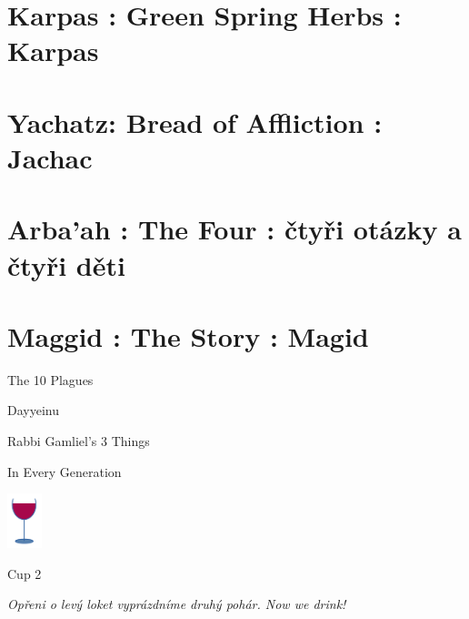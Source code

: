 \documentclass[a5paper,10pt]{memoir}
\begin{document}
\section{Karpas : Green Spring Herbs : Karpas}
 \Karpas
\vspace*{1ex}
\section{Yachatz: Bread of Affliction : Jachac}
\Yachatz
\vspace*{2ex}
\section{Arba'ah : The Four : čtyři otázky a čtyři děti}
\MaNishtana
\FourChildrenText
%
\vspace*{2ex}
\section{Maggid : The Story : Magid}
\MaggidIntro
\onecolumn
\begin{center}
	\noindent \large \color{midblue} The 10 Plagues \centering
\end{center}
\Plagues
\onecolumn
\begin{center}
	\noindent \large \color{midblue} Dayyeinu
\end{center}
\Dayyeinu
\begin{center}
	\noindent \large \color{midblue} Rabbi Gamliel's 3 Things
\end{center}
\Gamliel
\vspace*{2ex}
\begin{center}
	\noindent \large \color{midblue} In Every Generation
\end{center}
\EveryGeneration

\vspace*{2ex}
\hfill\includegraphics[width=10mm]{cup}
\vspace*{-15ex}  %

\begin{center}
	\noindent \large \color{midblue} Cup 2
\end{center}
\Kaddeish
\textit{Opřeni o levý loket vyprázdníme druhý pohár. \color{midblue}Now we drink!}
\onecolumn
\end{document}
